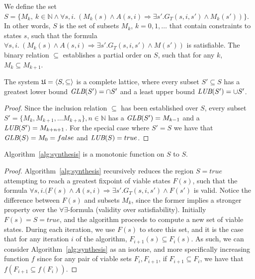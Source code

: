 
We define the set $S = \{M_k, \ k \in \mathbb{N} \land \forall s, i. \ (M_k(s) \land A(s,i) \Rightarrow \exists s'. G_T(s,i,s') \land M_k(s'))\}$. In other words, $S$ is the set of subsets $M_k$, $k = 0, 1 , \ldots$ that contain constraints to states $s$, such that the formula $\forall s, i. \ (M_k(s) \land A(s,i) \Rightarrow \exists s'. G_T(s,i,s') \land M(s'))$ is satisfiable. The binary relation $\subseteq$ establishes a partial order on $S$, such that for any $k$, $M_k \subseteq M_{k+1}$.

\begin{lemma} The system $\mathfrak{U} = \langle S, \subseteq \rangle$ is a complete lattice, where every subset $S' \subseteq S$ has a greatest lower bound  $\textit {GLB}(S') = \cap S'$  and a least upper bound $\textit {LUB}(S') = \cup S'$.
\label{lem:altlattice}
\end{lemma}
\begin{proof}
Since the inclusion relation $\subseteq$ has been established over $S$, every subset $S' = \{M_k, M_{k+1}, \ldots M_{k+n}\}, n \in \mathbb{N}$ has a $\textit {GLB}(S') = M_{k-1}$ and a $\textit {LUB}(S') = M_{k+n+1}$. For the special case where $S' = S$ we have that $\textit {GLB}(S) = M_0 = false$ and $\textit {LUB}(S) = true$.
\end{proof}

\begin{lemma} Algorithm~\ref{alg:synthesis} is a monotonic function on $S$ to $S$.
\label{lm:altmonotonicity}
\end{lemma}
\begin{proof}
Algorithm~\ref{alg:synthesis} recursively reduces the region $S = true$ attempting to reach a greatest fixpoint of viable states $F(s)$, such that the formula $\forall s, i. (F(s) \land A(s,i) \Rightarrow \exists s'. G_T(s,i,s') \land F(s')$ is valid. Notice the difference between $F(s)$ and subsets $M_k$, since the former implies a stronger property over the $\forall\exists$-formula (validity over satisfiability). Initially $F(s) = S = true$, and the algorithm proceeds to compute a new set of viable states. During each iteration, we use $F(s)$ to store this set, and it is the case that for any iteration $i$ of the algorithm, $F_{i+1}(s) \subseteq F_{i}(s)$. As such, we can consider Algorithm~\ref{alg:synthesis} as an isotone, and more specifically increasing function $f$ since for any pair of viable sets $F_{i}, F_{i+1}$, if $F_{i+1} \subseteq F_{i}$, we have that $f(F_{i+1} \subseteq f(F_{i}))$.
\end{proof}

